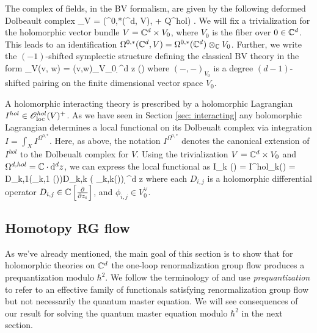 \documentclass[10pt]{amsart}
\begin{document}
The complex of fields, in the BV formalism, are given by the following deformed Dolbeault complex
\ben
\sE_V = \left(\Omega^{0,*}(\CC^d, V), \dbar + Q^{hol}\right) .
\een
We will fix a trivialization for the holomorphic vector bundle $V = \mathbb C^d \times V_0$, where $V_0$ is the fiber over $0 \in \mathbb C^d$.
This leads to an identification $\Omega^{0,*}(\mathbb C^d , V) = \Omega^{0,*}(\mathbb C^d) \otimes_\mathbb C V_0$.
Further, we write the $(-1)$-shifted symplectic structure defining the classical BV theory in the form
\ben
\omega_V(\alpha \tensor v, \beta \tensor w) = (v,w)_{V_0} \int \d^d z (\alpha \wedge \beta)
\een
where $(-,-)_{V_0}$ is a degree $(d-1)$-shifted pairing on the finite dimensional vector space $V_0$. 

A holomorphic interacting theory is prescribed by a holomorphic Lagrangian $I^{hol} \in \mathscr O_{\rm loc}^{hol}(V)^+$. 
As we have seen in Section \ref{sec: interacting} any holomorphic Lagrangian determines a local functional on its Dolbeualt complex via integration $I = \int_X I^{\Omega^{0,*}}$. 
Here, as above, the notation $I^{\Omega^{0,*}}$ denotes the canonical extension of $I^{hol}$ to the Dolbeualt complex for $V$. 
Using the trivialization $V = \mathbb C^d \times V_0$ and $\Omega^{d,hol} = \mathbb C \cdot {\rm d}^d z$, we can express the local functional as
\ben
I_k (\alpha) = \int I^{hol}_k(\alpha) = \int D_{k,1}(\phi_{k,1} (\alpha))\cdots D_{k,k} ( \phi_{k,k}(\alpha)) \d^d z 
\een
where each $D_{i,j}$ is a holomorphic differential operator $D_{i,j} \in \mathbb C\left[\frac{\partial}{\partial z_i}\right]$, and $\phi_{i,j} \in V_0^\vee$.



\subsection{Homotopy RG flow}

As we've already mentioned, the main goal of this section is to show that for holomorphic theories on $\mathbb C^d$ the one-loop renormalization group flow produces a prequantization modulo $\hbar^2$. 
We follow the terminology of \cite{CosRenorm} and use {\em prequantization} to refer to an effective family of functionals satisfying renormalization group flow but not necessarily the quantum master equation. 
We will see consequences of our result for solving the quantum master equation modulo $\hbar^2$ in the next section.  
\end{document}
